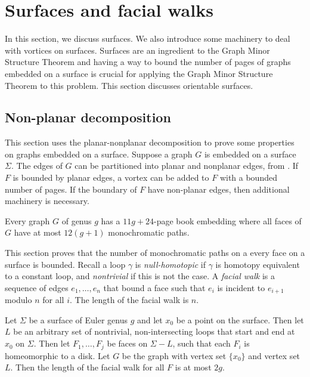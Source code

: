 
\section{Surfaces and facial walks}
In this section, we discuss surfaces. We also introduce some machinery to deal with vortices on surfaces. Surfaces are an ingredient to the Graph Minor Structure Theorem and having a way to bound the number of pages of graphs embedded on a surface is crucial for applying the Graph Minor Structure Theorem to this problem. This section discusses orientable surfaces.
\subsection{Non-planar decomposition}

This section uses the planar-nonplanar decomposition to prove some properties on graphs embedded on a surface. Suppose a graph \(G\) is embedded on a surface $\Sigma$. The edges of $G$ can be partitioned into planar and nonplanar edges, from \textcite{heathPagenumberGenusGraphs1992}. If \(F\) is bounded by planar edges, a vortex can be added to \(F\) with a bounded number of pages. If the boundary of $F$ have non-planar edges, then additional machinery is necessary.
\begin{theorem}
	Every graph \(G\) of genus \(g\) has a \(11g + 24\)-page book embedding where all faces of $G$ have at most \( 12(g + 1)\) monochromatic paths.
\end{theorem}

This section proves that the number of monochromatic paths on a every face on a surface is bounded. Recall a loop $\gamma$ is \textit{null-homotopic} if $\gamma$ is homotopy equivalent to a constant loop, and \textit{nontrivial} if this is not the case. A \textit{facial walk} is a sequence of edges \(e_1, \ldots, e_n\) that bound a face such that \(e_i\) is incident to \(e_{i + 1}\) modulo \(n\) for all \(i\). The length of the facial walk is \(n\).

\begin{lemma}\label{lem:orientable_facial_walks}
	Let \(\Sigma \) be a surface of Euler genus \(g\) and let \(x_0\) be a point on the surface. Then let \(L\) be an arbitrary set of nontrivial, non-intersecting loops that start and end at \(x_0\) on \(\Sigma \). Then let \(F_1, \ldots, F_j\) be faces on \(\Sigma - L\), such that each \(F_i\) is homeomorphic to a disk. Let $G$ be the graph with vertex set $\{x_0 \}$ and vertex set $L$. Then the length of the facial walk for all \(F\) is at most \(2g\).
\end{lemma}

